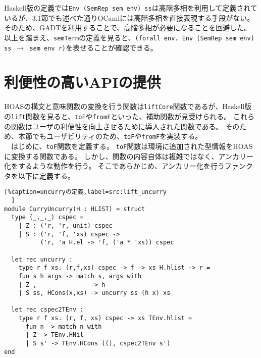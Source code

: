 \documentclass[uplatex]{sumiilab-paper}
\theoremstyle{mystyle}
\numberwithin{definition}{chapter} %
\begin{document}
Haskell版の定義では{\tt Env (SemRep sem env) ss}は高階多相を利用して定義されているが、3.1節でも述べた通りOCamlには高階多相を直接表現する手段がない。
そのため、GADTを利用することで、高階多相が必要になることを回避した。
以上を踏まえ、{\tt semTerm}の定義を見ると、{\tt (forall env. Env (SemRep sem env) ss $\rightarrow$ sem env r)}を表せることが確認できる。\\


\section{利便性の高いAPIの提供}
HOASの構文と意味関数の変換を行う関数は{\tt liftCore}関数であるが、Haskell版の{\tt lift}関数を見ると、{\tt toF}や{\tt fromF}といった、補助関数が見受けられる。
これらの関数はユーザの利便性を向上させるために導入された関数である。
そのため、本節でもユーザビリティのため、{\tt toF}や{\tt fromF}を実装する。\\
　はじめに、{\tt toF}関数を定義する。
{\tt toF}関数は環境に追加された型情報をHOASに変換する関数である。
しかし、関数の内容自体は複雑ではなく、アンカリー化をするような動作を行う。
そこであらかじめ、アンカリー化を行うファンクタを以下に定義する。

\begin{lstlisting}[%caption=uncurryの定義,label=src:lift_uncurry
  ]
module CurryUncurry(H : HLIST) = struct
  type (_,_,_) cspec = 
    | Z : ('r, 'r, unit) cspec 
    | S : ('r, 'f, 'xs) cspec -> 
          ('r, 'a H.el -> 'f, ('a * 'xs)) cspec 

  let rec uncurry : 
    type r f xs. (r,f,xs) cspec -> f -> xs H.hlist -> r = 
    fun s h args -> match s, args with  
    | Z ,   _           -> h 
    | S ss, HCons(x,xs) -> uncurry ss (h x) xs   

  let rec cspec2TEnv : 
    type r f xs. (r, f, xs) cspec -> xs TEnv.hlist = 
      fun n -> match n with   
      | Z -> TEnv.HNil 
      | S s' -> TEnv.HCons ((), cspec2TEnv s')
end
\end{lstlisting}
\end{document}
